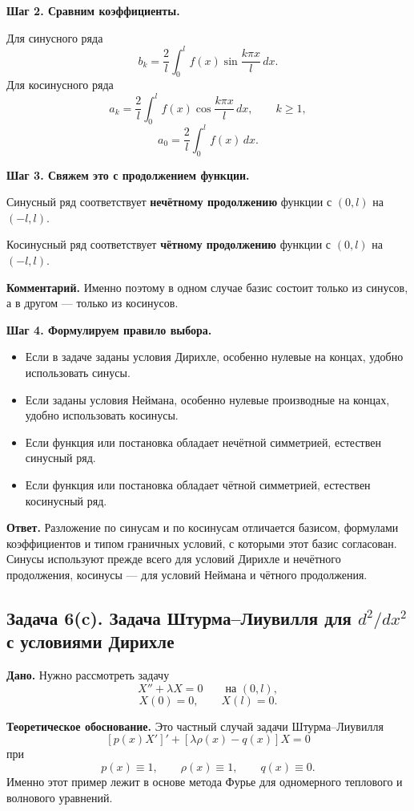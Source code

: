 \documentclass[a4paper,12pt]{article}
\begin{document}
\textbf{Шаг 2. Сравним коэффициенты.}

Для синусного ряда
\[
b_k=\frac{2}{l}\int_0^l f(x)\sin\frac{k\pi x}{l}\,dx.
\]
Для косинусного ряда
\[
a_k=\frac{2}{l}\int_0^l f(x)\cos\frac{k\pi x}{l}\,dx,
\qquad
k\ge 1,
\]
\[
a_0=\frac{2}{l}\int_0^l f(x)\,dx.
\]

\textbf{Шаг 3. Свяжем это с продолжением функции.}

Синусный ряд соответствует \textbf{нечётному продолжению} функции с $(0,l)$ на $(-l,l)$.

Косинусный ряд соответствует \textbf{чётному продолжению} функции с $(0,l)$ на $(-l,l)$.

\textbf{Комментарий.} Именно поэтому в одном случае базис состоит только из синусов, а в другом --- только из косинусов.

\textbf{Шаг 4. Формулируем правило выбора.}

\begin{itemize}
  \item Если в задаче заданы условия Дирихле, особенно нулевые на концах, удобно использовать синусы.
  \item Если заданы условия Неймана, особенно нулевые производные на концах, удобно использовать косинусы.
  \item Если функция или постановка обладает нечётной симметрией, естествен синусный ряд.
  \item Если функция или постановка обладает чётной симметрией, естествен косинусный ряд.
\end{itemize}

\textbf{Ответ.}
Разложение по синусам и по косинусам отличается базисом, формулами коэффициентов и типом граничных условий, с которыми этот базис согласован. Синусы используют прежде всего для условий Дирихле и нечётного продолжения, косинусы --- для условий Неймана и чётного продолжения.

\subsection*{Задача 6(c). Задача Штурма--Лиувилля для \texorpdfstring{$d^2/dx^2$}{d2/dx2} с условиями Дирихле}

\textbf{Дано.}
Нужно рассмотреть задачу
\[
X''+\lambda X=0
\qquad \text{на } (0,l),
\]
\[
X(0)=0,
\qquad
X(l)=0.
\]

\textbf{Теоретическое обоснование.}
Это частный случай задачи Штурма--Лиувилля
\[
[p(x)X']'+[\lambda \rho(x)-q(x)]X=0
\]
при
\[
p(x)\equiv 1,
\qquad
\rho(x)\equiv 1,
\qquad
q(x)\equiv 0.
\]
Именно этот пример лежит в основе метода Фурье для одномерного теплового и волнового уравнений.
\end{document}
